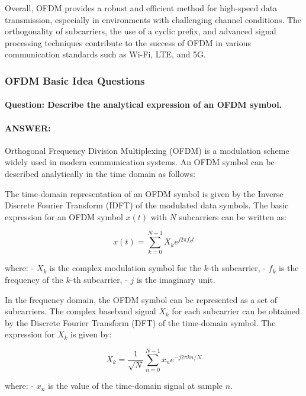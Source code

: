 \documentclass[colorlinks,11pt,a4paper,normalphoto,withhyper,ragged2e]{altareport}
\begin{document}
			Overall, OFDM provides a robust and efficient method for high-speed data transmission, especially in environments with challenging channel conditions. The orthogonality of subcarriers, the use of a cyclic prefix, and advanced signal processing techniques contribute to the success of OFDM in various communication standards such as Wi-Fi, LTE, and 5G.
			
			
			
			
			
			
			
			
			\subsubsection{OFDM Basic Idea Questions}
				
				
				\paragraph{Question: Describe the analytical expression of an OFDM symbol.}
				\paragraph{ANSWER:}
				
				Orthogonal Frequency Division Multiplexing (OFDM) is a modulation scheme widely used in modern communication systems. An OFDM symbol can be described analytically in the time domain as follows:
				
				The time-domain representation of an OFDM symbol is given by the Inverse Discrete Fourier Transform (IDFT) of the modulated data symbols. The basic expression for an OFDM symbol \(x(t)\) with \(N\) subcarriers can be written as:
				
				\[ x(t) = \sum_{k=0}^{N-1} X_k e^{j2\pi f_k t} \]
				
				where:
				- \(X_k\) is the complex modulation symbol for the \(k\)-th subcarrier,
				- \(f_k\) is the frequency of the \(k\)-th subcarrier,
				- \(j\) is the imaginary unit.
				
				In the frequency domain, the OFDM symbol can be represented as a set of subcarriers. The complex baseband signal \(X_k\) for each subcarrier can be obtained by the Discrete Fourier Transform (DFT) of the time-domain symbol. The expression for \(X_k\) is given by:
				
				\[ X_k = \frac{1}{\sqrt{N}} \sum_{n=0}^{N-1} x_n e^{-j2\pi k n / N} \]
				
				where:
				- \(x_n\) is the value of the time-domain signal at sample \(n\).
				
\end{document}
